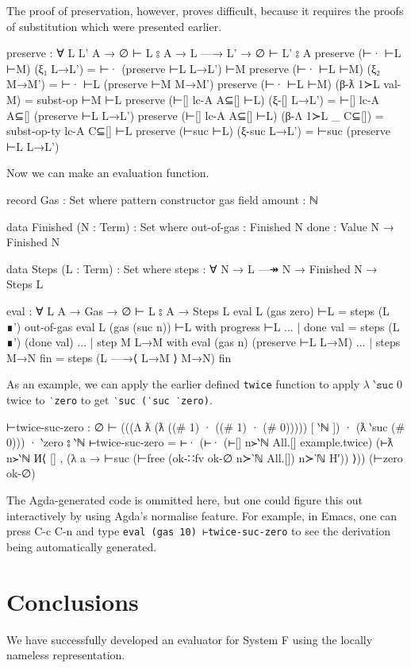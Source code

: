 \documentclass[logo,bsc,singlespacing,parskip,online]{infthesis}
\begin{document}
The proof of preservation, however, proves difficult, because it requires the proofs of substitution
which were presented earlier.
\begin{code}
  preserve : ∀ {L L' A} → ∅ ⊢ L ⦂ A → L —→ L' → ∅ ⊢ L' ⦂ A
  preserve (⊢· ⊢L ⊢M) (ξ₁ L→L') = ⊢· (preserve ⊢L L→L') ⊢M
  preserve (⊢· ⊢L ⊢M) (ξ₂ M→M') = ⊢· ⊢L (preserve ⊢M M→M')
  preserve (⊢· ⊢L ⊢M) (β-ƛ 1≻L val-M) = subst-op ⊢M ⊢L
  preserve (⊢[] lc-A A⊆[] ⊢L) (ξ-[] L→L') =
    ⊢[] lc-A A⊆[] (preserve ⊢L L→L')
  preserve (⊢[] lc-A A⊆[] ⊢L) (β-Λ 1≻L _ C⊆[]) =
    subst-op-ty lc-A C⊆[] ⊢L
  preserve (⊢suc ⊢L) (ξ-suc L→L') = ⊢suc (preserve ⊢L L→L')
\end{code}

Now we can make an evaluation function.
\begin{code}
  record Gas : Set where
    pattern
    constructor gas
    field
      amount : ℕ

  data Finished (N : Term) : Set where
    out-of-gas : Finished N
    done : Value N → Finished N

  data Steps (L : Term) : Set where
    steps : ∀ {N} → L —↠ N → Finished N → Steps L

  eval : ∀ {L A} → Gas → ∅ ⊢ L ⦂ A → Steps L
  eval {L} (gas zero) ⊢L = steps (L ∎') out-of-gas
  eval {L} (gas (suc n)) ⊢L with progress ⊢L
  ... | done val = steps (L ∎') (done val)
  ... | step {M} L→M with eval (gas n) (preserve ⊢L L→M)
  ...   | steps M→N fin = steps (L —→⟨ L→M ⟩ M→N) fin
\end{code}

As an example, we can apply the earlier defined \texttt{twice} function to apply $\lambda \;
\texttt{‵suc} \; 0$ twice to \texttt{‵zero} to get \texttt{‵suc (‵suc ‵zero)}.
\begin{code}
  ⊢twice-suc-zero :
    ∅ ⊢ (((Λ ƛ (ƛ ((# 1) · ((# 1) · (# 0))))) [ ‵ℕ ])
          · (ƛ ‵suc (# 0))) · ‵zero
        ⦂ ‵ℕ
  ⊢twice-suc-zero = ⊢·
    (⊢· (⊢[] n≻‵ℕ All.[] example.twice)
      (⊢ƛ n≻‵ℕ И⟨ [] , (λ a →
        ⊢suc (⊢free (ok-∷fv ok-∅ n≻‵ℕ All.[]) n≻‵ℕ H′)) ⟩))
    (⊢zero ok-∅)
\end{code}

The Agda-generated code is ommitted here, but one could figure this out interactively by using
Agda's normalise feature. For example, in Emacs, one can press C-c C-n and type \texttt{eval (gas 10) ⊢twice-suc-zero} to see the derivation being automatically generated.

\chapter{Conclusions}
We have successfully developed an evaluator for System F using the locally nameless representation.
\end{document}
